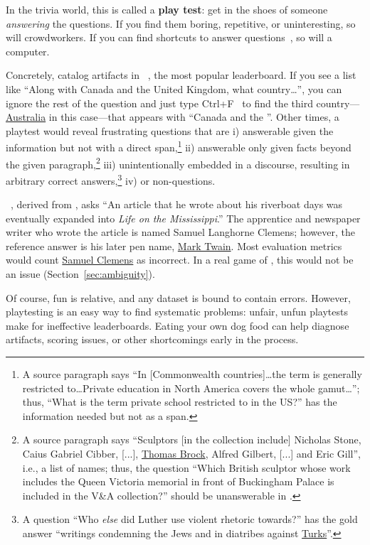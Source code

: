 In the trivia world, this is called a {\bf play test}:
get in the shoes of someone \emph{answering} the questions.
If you find them boring, repetitive, or uninteresting, so will
crowdworkers.
If you can find shortcuts to answer questions~\citep{rondeau-18,
  kaushik-18}, so will a computer.

Concretely, \citet{weissenborn-17} catalog artifacts in \squad{}~\citep{rajpurkar-18}, the most popular  leaderboard.
If you see a list like ``Along with Canada and the United Kingdom, what country\dots'', you can ignore the rest of the question and just type Ctrl+F~\citep{yuan-19, russell-20} to find the third country---\underline{Australia} in this case---that appears with ``Canada and the ''.
Other times, a \squad{} playtest would reveal frustrating questions that are 
i) answerable given the information but not with a direct span,\footnote{A source paragraph says ``In [Commonwealth countries]\dots the term is generally restricted to\dots Private education in North America covers the whole gamut\dots''; thus, ``What is the term private school restricted to in the US?'' has the information needed but not as a span.}
ii) answerable only given facts beyond the given paragraph,\footnote{A source paragraph says ``Sculptors [in the collection include] Nicholas Stone, Caius Gabriel Cibber, [...], \underline{Thomas Brock}, Alfred Gilbert, [...] and Eric Gill'', i.e., a list of names; thus, the question ``Which British sculptor whose work includes the Queen Victoria memorial in front of Buckingham Palace is included in the V\&A collection?'' should be unanswerable in \squad{}.}
iii) unintentionally embedded in a discourse, resulting
in arbitrary correct answers,\footnote{A question ``Who \emph{else} did Luther use violent rhetoric towards?'' has the gold answer ``writings condemning the Jews and in diatribes against \underline{Turks}''.}
iv)  or non-questions.

\searchqa{}~\citep{dunn-17}, derived from \jeopardy{}, asks ``An article that he wrote about his riverboat days was eventually expanded into \textit{Life on the Mississippi}.''
The apprentice and newspaper writer who wrote the article is named Samuel Langhorne Clemens; however, the reference answer is his later pen name, \underline{Mark Twain}.
Most \qa{} evaluation metrics would count \underline{Samuel Clemens} as incorrect.
In a real game of \jeopardy{}, this would not be an issue (Section~\ref{sec:ambiguity}).

Of course, fun is relative, and any dataset is bound to contain errors.
However, playtesting is an easy way to find systematic problems: unfair, unfun playtests make for ineffective leaderboards.
Eating your own dog food can help diagnose artifacts, scoring issues, or other shortcomings early in the process.

